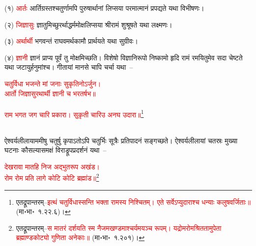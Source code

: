 \begin{sloppypar}\justifying\noindent\hspace{10mm} (१) \textcolor{red}{आर्तः} आर्ति\-ग्रस्तश्चतुर्णामपि पुरुषार्थानां लिप्सया परमात्मानं प्रपद्यते यथा विभीषणः।\end{sloppypar}
\begin{sloppypar}\justifying\noindent\hspace{10mm} (२) \textcolor{red}{जिज्ञासुः} ज्ञातुमिच्छुरर्थाद्धर्म\-मोक्ष\-लिप्सया श्रीरामं शुश्रूषते यथा लक्ष्मणः।\end{sloppypar}
\begin{sloppypar}\justifying\noindent\hspace{10mm} (३) \textcolor{red}{अर्थार्थी} भगवन्तं राघवमर्थ\-कामौ प्रार्थयते यथा सुग्रीवः।\end{sloppypar}
\begin{sloppypar}\justifying\noindent\hspace{10mm} (४) \textcolor{red}{ज्ञानी} ज्ञानं प्राप्य पूर्वं तु मोक्षमिच्छति। विशेषो विज्ञानि\-रूपो निष्कामो हृदि रामं रमयितुमेव सदा चेष्टते यथा जटायुर्हनुमांश्च। गीतायां मानसे चापि चर्चा यथा~–\end{sloppypar}
\centering\textcolor{red}{चतुर्विधा भजन्ते मां जनाः सुकृतिनोऽर्जुन।\nopagebreak\\
आर्तो जिज्ञासुरथार्थी ज्ञानी च भरतर्षभ॥}\nopagebreak\\
\\
\centering\textcolor{red}{राम भगत जग चारि प्रकारा। सुकृती चारिउ अनघ उदारा॥}\footnote{एतद्रूपान्तरम्–\textcolor{red}{इत्थं चतुर्विधास्सन्ति भक्ता रामस्य निश्चितम्। एते सर्वेऽप्युदाराश्च धन्याः कलुष\-वर्जिताः॥} (मा॰भा॰~१.२२.६)।}\nopagebreak\\
\\
\begin{sloppypar}\justifying\noindent ऐश्वर्य\-लीलायाममीषु चतुर्षु कृपाऽतोऽपि चतुर्भिः सूत्रैः प्रतिपादनं सङ्गच्छते। ऐश्वर्य\-लीलायां चतस्रः मुख्या घटनाः कौसल्या\-समक्षं विराड्रूप\-प्रदर्शनं यथा~–\end{sloppypar}
\centering\textcolor{red}{देखरावा मातहि निज अद्भुतरूप अखंड।\nopagebreak\\
रोम रोम प्रति लागे कोटि कोटि ब्रह्मांड॥}\footnote{एतद्रूपान्तरम्–\textcolor{red}{स मातरं दर्शयति स्म नैजमखण्डमाश्चर्यमयञ्च रूपम्। यद्रोमरोमश्रिततामुपेता ब्रह्माण्ड\-कोट्यो गुणिता अनेकाः॥} (मा॰भा॰~१.२०१)।}\nopagebreak\\
